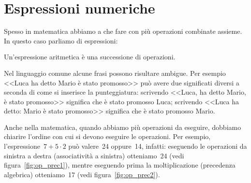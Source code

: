 \section{Espressioni numeriche}
\label{sec:01_espressioni}

Spesso in matematica abbiamo a che fare con più operazioni combinate 
assieme.
In questo caso parliamo di espressioni:

\begin{definizione}
 Un'espressione aritmetica è una successione di operazioni.
\end{definizione}

Nel linguaggio comune alcune frasi possono risultare ambigue. Per esempio
<<Luca ha detto Mario è stato promosso>> può avere due significati diversi
a seconda di come si inserisce la punteggiatura:
scrivendo <<Luca, ha detto Mario, è stato promosso>> significa che è stato 
promosso Luca;
scrivendo <<Luca ha detto: Mario è stato promosso>> significa che è stato 
promosso Mario.

Anche nella matematica, quando abbiamo più operazioni da eseguire, dobbiamo 
chiarire l'ordine con cui si devono eseguire le operazioni. 
Per esempio, l'espressione~\(7+5\cdot2\) può valere~24 oppure~14, infatti:
eseguendo le operazioni da sinistra a destra (associatività a sinistra) 
otteniamo~24 (vedi figura~\ref{fig:op_prec1}), 
mentre eseguendo prima la moltiplicazione (precedenza algebrica) 
otteniamo~17
(vedi figura~\ref{fig:op_prec2}).
 
